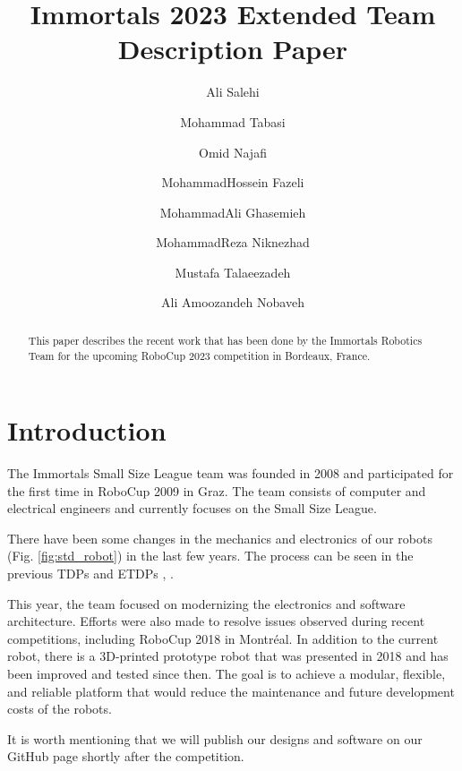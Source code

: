 \documentclass[runningheads]{llncs}
\begin{document}
%
\title{Immortals 2023 Extended Team Description Paper}

\author{Ali Salehi \and
Mohammad Tabasi \and
Omid Najafi \and
MohammadHossein Fazeli \and
MohammadAli Ghasemieh \and
MohammadReza Niknezhad \and
Mustafa Talaeezadeh \and
Ali Amoozandeh Nobaveh}
%
%
%
\maketitle              %
%
\begin{abstract}
This paper describes the recent work that has been done by the Immortals Robotics Team for the upcoming RoboCup 2023 competition in Bordeaux, France.

\end{abstract}
%
%
%
\section{Introduction}
The Immortals Small Size League team was founded in 2008 and participated for the first time in RoboCup 2009 in Graz. The team consists of computer and electrical engineers and currently focuses on the Small Size League.

There have been some changes in the mechanics and electronics of our robots (Fig. \ref{fig:std_robot}) in the last few years. The process can be seen in the previous TDPs and ETDPs \cite{ref_ETDP2019}, \cite{ref_ETDP2020}.
 
This year, the team focused on modernizing the electronics and software architecture. Efforts were also made to resolve issues observed during recent competitions, including RoboCup 2018 in Montréal. In addition to the current robot, there is a 3D-printed prototype robot that was presented in 2018 and has been improved and tested since then. The goal is to achieve a modular, flexible, and reliable platform that would reduce the maintenance and future development costs of the robots. 

It is worth mentioning that we will publish our designs and software on our GitHub page \cite{ref_github} shortly after the competition.
\end{document}
